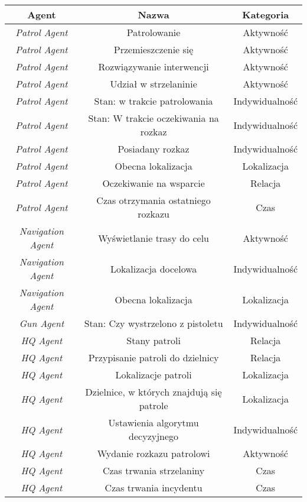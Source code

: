 \begin{table}[H]
    \centering
    \begin{tabular}{|c|c|c|} 
     \hline
     Agent & Nazwa & Kategoria \\
     \hline
     \hline
     \emph{Patrol Agent} & Patrolowanie & Aktywność \\ 
     \hline
     \emph{Patrol Agent} & Przemieszczenie się & Aktywność \\ 
     \hline
     \emph{Patrol Agent} & Rozwiązywanie interwencji & Aktywność \\ 
     \hline
     \emph{Patrol Agent} & Udział w strzelaninie & Aktywność \\ 
     \hline
     \emph{Patrol Agent} & Stan: w trakcie patrolowania & Indywidualność \\ 
     \hline
     \emph{Patrol Agent} & Stan: W trakcie oczekiwania na rozkaz & Indywidualność \\ 
     \hline
     \emph{Patrol Agent} & Posiadany rozkaz & Indywidualność \\ 
     \hline
     \emph{Patrol Agent} & Obecna lokalizacja & Lokalizacja \\ 
     \hline
     \emph{Patrol Agent} & Oczekiwanie na wsparcie & Relacja \\ 
     \hline
     \emph{Patrol Agent} & Czas otrzymania ostatniego rozkazu & Czas \\ 
     \hline
     
     \emph{Navigation Agent} & Wyświetlanie trasy do celu & Aktywność \\ 
     \hline
     \emph{Navigation Agent} & Lokalizacja docelowa & Indywidualność \\ 
     \hline
     \emph{Navigation Agent} & Obecna lokalizacja & Lokalizacja \\
     \hline

     \emph{Gun Agent} & Stan: Czy wystrzelono z pistoletu & Indywidualność \\
     \hline

     \emph{HQ Agent} & Stany patroli & Relacja \\
     \hline
     \emph{HQ Agent} & Przypisanie patroli do dzielnicy & Relacja \\
     \hline
     \emph{HQ Agent} & Lokalizacje patroli & Lokalizacja \\
     \hline
     \emph{HQ Agent} & Dzielnice, w których znajdują się patrole & Lokalizacja \\
     \hline
     \emph{HQ Agent} & Ustawienia algorytmu decyzyjnego & Indywidualność \\
     \hline
     \emph{HQ Agent} & Wydanie rozkazu patrolowi & Aktywność \\
     \hline
     \emph{HQ Agent} & Czas trwania strzelaniny & Czas \\
     \hline
     \emph{HQ Agent} & Czas trwania incydentu & Czas \\
     \hline


\end{tabular}
\end{table}
